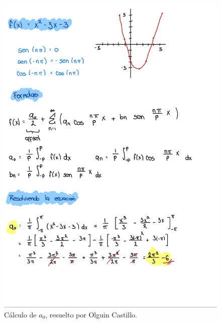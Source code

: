 {%
    \begin{figure}[H]
        \centering
        \includegraphics[width=\linewidth]{Figures/fourierManuel/a0.jpeg}
        \caption[Cálculo de \(a_0\)]{Cálculo de \(a_0\), resuelto por Olguin Castillo.}
        \label{fig:figure-manuel-01}
    \end{figure}

}
